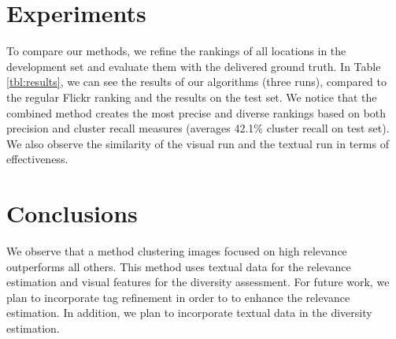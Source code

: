 \documentclass{acm_proc_article-me11_tweaked}
\begin{document}
\section{Experiments}
To compare our methods, we refine the rankings of all locations in the development set and evaluate them with the delivered ground truth.
In Table \ref{tbl:results}, we can see the results of our algorithms (three runs), compared to the regular Flickr ranking and the results on the test set.
We notice that the combined method creates the most precise and diverse rankings based on both precision and cluster recall measures (averages 42.1\% cluster recall on test set). 
We also observe the similarity of the visual run and the textual run in terms of effectiveness.

\section{Conclusions}
We observe that a method clustering images focused on high relevance outperforms all others.
This method uses textual data for the relevance estimation and visual features for the diversity assessment.
For future work, we plan to incorporate tag refinement in order to to enhance the relevance estimation. In addition, we plan to incorporate textual data in the diversity estimation.

%

\end{document}
